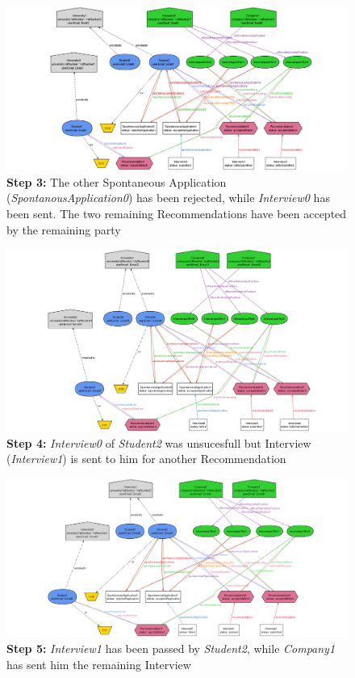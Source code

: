 \begin{figure}[H]
    \hspace{-2.5cm}
    \includegraphics[width=1.3\linewidth]{Latex/Images/RASD/Alloy/3.png}
    \caption*{\textbf{Step 3:} The other Spontaneous Application (\textit{SpontanousApplication0}) has been rejected, while \textit{Interview0} has been sent. The two remaining Recommendations have been accepted by the remaining party}
    \label{fig:ALIMG3}
\end{figure}
\begin{figure}[H]
    \hspace{-2.5cm}
    \includegraphics[width=1.3\linewidth]{Latex/Images/RASD/Alloy/4.png}
    \caption*{\textbf{Step 4:} \textit{Interview0} of \textit{Student2} was unsucesfull but Interview (\textit{Interview1}) is sent to him for another Recommendation}
    \label{fig:ALIMG4}
\end{figure}
\begin{figure}[H]
    \hspace{-2.5cm}
    \includegraphics[width=1.3\linewidth]{Latex/Images/RASD/Alloy/5.png}
    \caption*{\textbf{Step 5:} \textit{Interview1} has been passed by \textit{Student2}, while \textit{Company1} has sent him the remaining Interview}
    \label{fig:ALIMG5}
\end{figure}


